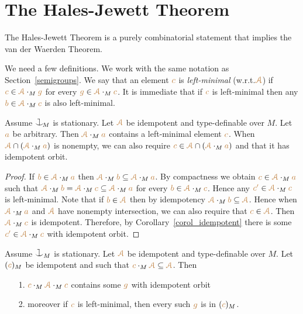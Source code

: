 \section{The Hales-Jewett Theorem}
\label{HJ}

The Hales-Jewett Theorem is a purely combinatorial statement 
that implies the van der Waerden Theorem.

We need a few definitions.
We work with the same notation as Section~\ref{semigroups}.
We say that an element ${\mr c}$ is \emph{left-minimal\/} (w.r.t.\@ $\mrA$) if 
${\mr c}\in\mrA\cdot_M{\mr g}$ for every ${\mr g}\in\mrA\cdot_M{\mr c}$.
It is immediate that if ${\mr c}$ is left-minimal then any ${\mr b}\in\mrA\cdot_M{\mr c}$ is also left-minimal.%

\begin{proposition}\label{prop_minimal_existence1}
Assume $\cnonfork_{\!M}$ is stationary.
Let $\mrA$ be idempotent and type-definable over $M$.
Let ${\mr a}$ be arbitrary.
Then $\mrA\cdot_M{\mr a}$ contains a left-minimal element ${\mr c}$.
When $\mrA\cap(\mrA\cdot_M{\mr a})$ is nonempty, we can also require ${\mr c}\in\mrA\cap(\mrA\cdot_M{\mr a})$ and that it has idempotent orbit.
\end{proposition}
\begin{proof}
If ${\mr b}\in\mrA\cdot_M{\mr a}$ then $\mrA\cdot_M{\mr b}\subseteq\mrA\cdot_M{\mr a}$.
By compactness we obtain ${\mr c}\in\mrA\cdot_M{\mr a}$ such that $\mrA\cdot_M{\mr b}=\mrA\cdot_M{\mr c}\subseteq\mrA\cdot_M{\mr a}$ for every ${\mr b}\in\mrA\cdot_M{\mr c}$.
Hence any ${\mr c'}\in\mrA\cdot_M{\mr c}$ is left-minimal.
Note that if ${\mr b}\in\mrA$ then by idempotency  $\mrA\cdot_M{\mr b}\subseteq\mrA$. Hence when $\mrA\cdot_M{\mr a}$ and $\mrA$ have nonempty intersection, we can also require that ${\mr c}\in\mrA$. 
Then $\mrA\cdot_M{\mr c}$ is idempotent. 
Therefore, by Corollary~\ref{corol_idempotent} there is some ${\mr c'}\in\mrA\cdot_M{\mr c}$ with idempotent orbit.
\end{proof}

\begin{proposition}\label{prop_minimal_existence2}
  Assume $\cnonfork_M$ is stationary.
  Let $\mrA$ be idempotent and type-definable over $M$.
  Let $({\mr c})_M$ be idempotent and such that ${\mr c}\cdot_M\mrA\subseteq\mrA$.
  Then
  \begin{itemize}
  \item[1.]  ${\mr c}\cdot_M\mrA\cdot_M{\mr c}$ contains some ${\mr g}$ with idempotent orbit
  \item[2.] moreover if ${\mr c}$ is left-minimal, then every such ${\mr g}$ is in $({\mr c})_M$.
  \end{itemize} 
\end{proposition}


